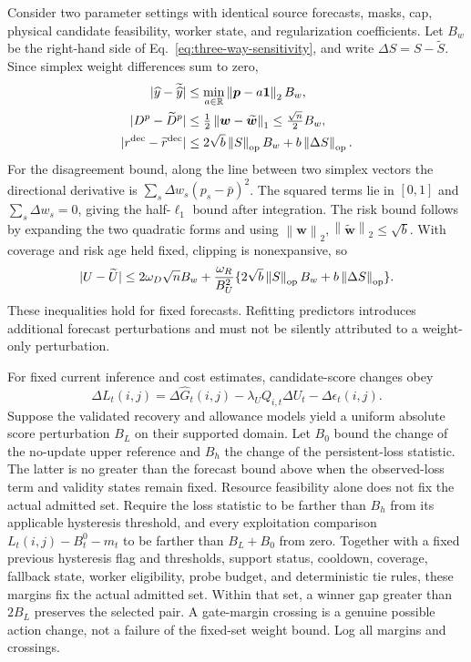 \documentclass[10pt]{article}
\newcommand{\R}{\mathbb{R}}
\newcommand{\norm}[1]{\left\lVert #1\right\rVert}
\begin{document}
Consider two parameter settings with identical source forecasts, masks, cap, physical candidate feasibility,
worker state, and
regularization coefficients. Let $B_w$ be the right-hand side of
Eq.~\eqref{eq:three-way-sensitivity}, and write
$\Delta S=S-\widetilde S$. Since simplex weight differences sum to zero,
\begin{align}
 |\widehat y-\widetilde{\widehat y}|
 &\le\min_{a\in\R}\norm{\boldsymbol p-a\boldsymbol1}_2 B_w,\\
 |D^p-\widetilde D^p|&\le\tfrac12\norm{\boldsymbol w-
                      \widetilde{\boldsymbol w}}_1
                      \le\tfrac{\sqrt n}{2}B_w,\\
 |r^{\rm dec}-\widetilde r^{\rm dec}|
 &\le2\sqrt b\norm{S}_{\rm op}B_w+b\norm{\Delta S}_{\rm op}.
 \label{eq:representation-sensitivity}
\end{align}
For the disagreement bound, along the line between two simplex vectors the
directional derivative is
$\sum_s\Delta w_s(p_s-\bar p)^2$. The squared terms lie in $[0,1]$ and
$\sum_s\Delta w_s=0$, giving the half-$\ell_1$ bound after integration.
The risk bound follows by expanding the two quadratic forms and using
$\norm{\boldsymbol w}_2,\norm{\widetilde{\boldsymbol w}}_2\le\sqrt b$.
With coverage and risk age held fixed, clipping is nonexpansive, so
\begin{equation}
 |U-\widetilde U|\le
 2\omega_D\sqrt n B_w+
 \frac{\omega_R}{B_U^2}\{2\sqrt b\norm{S}_{\rm op}B_w+b\norm{\Delta S}_{\rm op}\}.
 \label{eq:uncertainty-sensitivity}
\end{equation}
These inequalities hold for fixed forecasts. Refitting predictors introduces
additional forecast perturbations and must not be silently attributed to a
weight-only perturbation.

For fixed current inference and cost estimates, candidate-score changes obey
\begin{equation}
 \Delta L_t(i,j)=\Delta\widehat G_t(i,j)
                -\lambda_UQ_{i,t}\Delta U_t-\Delta\epsilon_t(i,j).
 \label{eq:score-propagation}
\end{equation}
Suppose the validated recovery and allowance models yield a uniform absolute
score perturbation $B_L$ on their supported domain. Let $B_0$ bound the change
of the no-update upper reference and $B_h$ the change of the persistent-loss
statistic. The latter is no greater than the forecast bound above when the
observed-loss term and validity states remain fixed. Resource feasibility alone
does not fix the actual admitted set. Require the loss statistic to be farther
than $B_h$ from its applicable hysteresis threshold, and every exploitation
comparison $L_t(i,j)-B_t^0-m_t$ to be farther than $B_L+B_0$ from zero.
Together with a fixed previous hysteresis flag and thresholds, support status,
cooldown, coverage, fallback state, worker
eligibility, probe budget, and deterministic tie rules, these margins fix the
actual admitted set. Within that set, a winner gap greater than $2B_L$ preserves
the selected pair. A gate-margin crossing is a genuine possible action change,
not a failure of the fixed-set weight bound. Log all margins and crossings.
\end{document}
